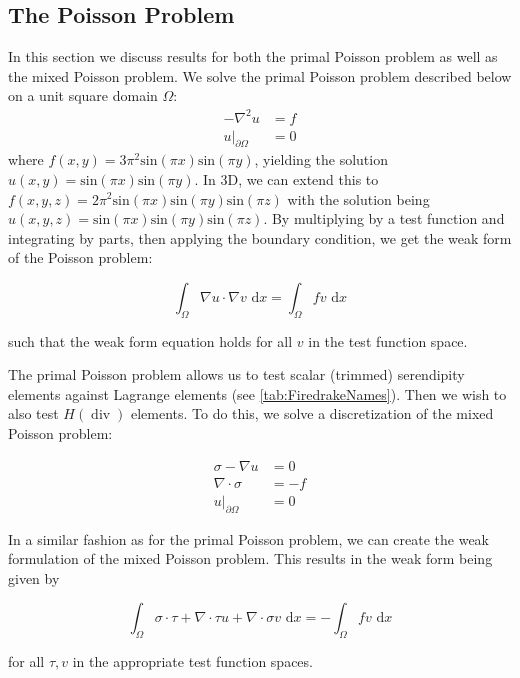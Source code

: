 \documentclass[format=acmsmall,screen,timestamp=false,a4paper]{acmart}
\DeclareMathOperator{\Div}{div}
\newcommand{\hdiv}{\ensuremath{{H}(\Div)}\xspace}
\begin{document}
\subsection{The Poisson Problem}
In this section we discuss results for both the primal Poisson problem as well as the mixed Poisson problem.  We solve the primal Poisson problem described below on a unit square domain $\Omega$:
\begin{align}
    -\nabla^2 u &= f \\
    u\vert_{\partial \Omega} &= 0
\end{align}
where $f(x,y) = 3\pi^2\text{sin}(\pi x)\text{sin}(\pi y) $, yielding the solution $u(x,y) = \text{sin}(\pi x)\text{sin}(\pi y)$. In 3D, we can extend this to $f(x,y,z) = 2\pi^2\text{sin}(\pi x)\text{sin}(\pi y)\text{sin}(\pi z)$ with the solution being $u(x,y,z) = \text{sin}(\pi x)\text{sin}(\pi y)\text{sin}(\pi z)$.  By multiplying by a test function and integrating by parts, then applying the boundary condition, we get the weak form of the Poisson problem:

\begin{equation}
    \int_\Omega \nabla u \cdot \nabla v \text{ d}x = \int_\Omega f v \text{ d}x
\end{equation}

\noindent such that the weak form equation holds for all $v$ in the test function space.

The primal Poisson problem allows us to test scalar (trimmed) serendipity elements against Lagrange elements (see \cref{tab:FiredrakeNames}).  Then we wish to also test \hdiv elements.  To do this, we solve a discretization of the mixed Poisson problem:

\begin{align}
     \sigma - \nabla u &= 0 \\
     \nabla \cdot \sigma &= -f  \\
     u\vert_{\partial \Omega} &= 0 
\end{align}

In a similar fashion as for the primal Poisson problem, we can create the weak formulation of the mixed Poisson problem.  This results in the weak form being given by

\begin{equation}
    \int_\Omega \sigma \cdot \tau + \nabla \cdot \tau u + \nabla \cdot \sigma v \text{ d}x = - \int_\Omega fv \text{ d}x
\end{equation}

\noindent for all $\tau, v$ in the appropriate test function spaces.  
\end{document}
